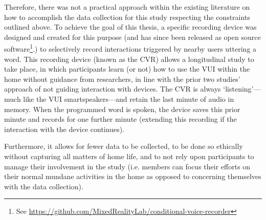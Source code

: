 \begin{revisedsubmission}
Therefore, there was not a practical approach within the existing literature on how to accomplish the data collection for this study respecting the constraints outlined above.
To achieve the goal of this thesis, a specific recording device was designed and created for this purpose (and has since been released as open source software\footnote{See \url{https://github.com/MixedRealityLab/conditional-voice-recorder}}.) to selectively record interactions triggered by nearby users uttering a word.
This recording device (known as the \ac{CVR}) allows a longitudinal study to take place, in which participants learn (or not) how to use the \ac{VUI} within the home without guidance from researchers, in line with the prior two studies' approach of not guiding interaction with devices.
The \ac{CVR} is always `listening'---much like the \ac{VUI} smartspeakers---and retain the last minute of audio in memory.
When the programmed word is spoken, the device saves this prior minute and records for one further minute (extending this recording if the interaction with the device continues).

Furthermore, it allows for fewer data to be collected, to be done so ethically without capturing all matters of home life, and to not rely upon participants to manage their involvement in the study (i.e. members can focus their efforts on their normal mundane activities in the home as opposed to concerning themselves with the data collection).


\end{revisedsubmission}

